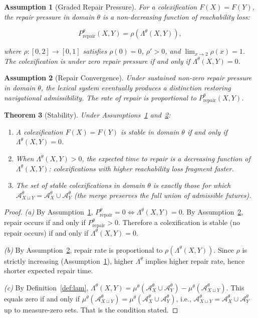 \documentclass[12pt]{article}
\theoremstyle{rthm}
\newtheorem{theorem}{Theorem}[section]
\theoremstyle{rdef}
\newtheorem{assumption}[theorem]{Assumption}
\theoremstyle{remark}
\newcommand{\A}{\mathcal{A}}
\newcommand{\Lam}[1][\theta]{\Lambda^{#1}}
\begin{document}
\begin{assumption}[Graded Repair Pressure]
\label{asm:repair}
For a colexification $F(X) = F(Y)$, the repair pressure in domain $\theta$ is
a non-decreasing function of reachability loss:

\[
P^{\theta}_{\mathrm{repair}}(X,Y) = \rho\!\left(\Lam(X,Y)\right),
\]

where $\rho : [0,2] \to [0,1]$ satisfies $\rho(0) = 0$, $\rho' > 0$, and
$\lim_{x \to 2} \rho(x) = 1$. The colexification is under zero repair pressure
if and only if $\Lam(X,Y) = 0$.
\end{assumption}

\begin{assumption}[Repair Convergence]
\label{asm:convergence}
Under sustained non-zero repair pressure in domain $\theta$, the lexical system
eventually produces a distinction restoring navigational admissibility. The
rate of repair is proportional to $P^{\theta}_{\mathrm{repair}}(X,Y)$.
\end{assumption}

\begin{theorem}[Stability]
\label{thm:stability}
Under Assumptions~\ref{asm:repair} and~\ref{asm:convergence}:
\begin{enumerate}[label=(\alph*)]
  \item A colexification $F(X) = F(Y)$ is \emph{stable} in domain $\theta$
        if and only if $\Lam(X,Y) = 0$.
  \item When $\Lam(X,Y) > 0$, the expected time to repair is a decreasing
        function of $\Lam(X,Y)$: colexifications with higher reachability loss
        fragment faster.
  \item The set of stable colexifications in domain $\theta$ is exactly those
        for which $\A_{X \sqcup Y}^{\theta} = \A_X^{\theta} \cup \A_Y^{\theta}$
        (the merge preserves the full union of admissible futures).
\end{enumerate}
\end{theorem}

\begin{proof}
\emph{(a)} By Assumption~\ref{asm:repair}, $P^{\theta}_{\mathrm{repair}} = 0
\iff \Lam(X,Y) = 0$. By Assumption~\ref{asm:convergence}, repair occurs if and
only if $P^{\theta}_{\mathrm{repair}} > 0$. Therefore a colexification is stable
(no repair occurs) if and only if $\Lam(X,Y) = 0$.

\emph{(b)} By Assumption~\ref{asm:convergence}, repair rate is proportional to
$\rho(\Lam(X,Y))$. Since $\rho$ is strictly increasing (Assumption~\ref{asm:repair}),
higher $\Lam$ implies higher repair rate, hence shorter expected repair time.

\emph{(c)} By Definition~\ref{def:lam}, $\Lam(X,Y) = \mu^{\theta}(\A_X^{\theta}
\cup \A_Y^{\theta}) - \mu^{\theta}(\A_{X \sqcup Y}^{\theta})$. This equals zero
if and only if $\mu^{\theta}(\A_{X \sqcup Y}^{\theta}) = \mu^{\theta}(\A_X^{\theta}
\cup \A_Y^{\theta})$, i.e., $\A_{X \sqcup Y}^{\theta} = \A_X^{\theta} \cup
\A_Y^{\theta}$ up to measure-zero sets. That is the condition stated.
\end{proof}
\end{document}
